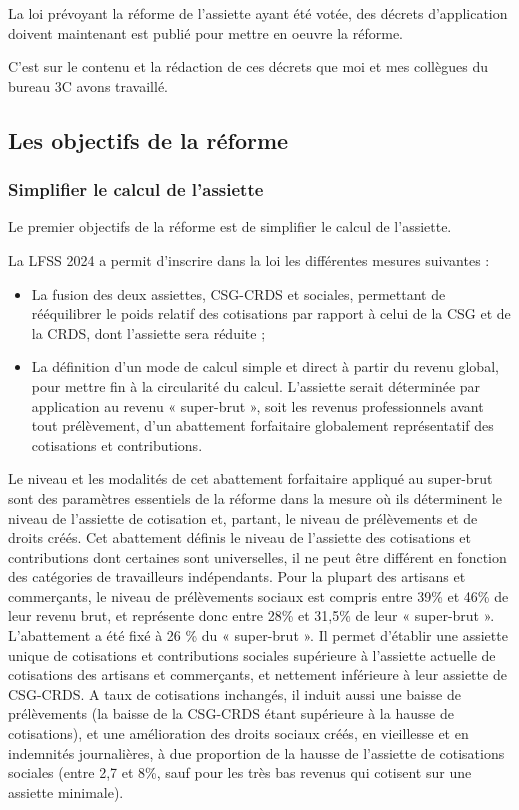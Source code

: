 La loi prévoyant la réforme de l'assiette ayant été votée, des décrets d'application doivent maintenant est publié pour mettre en oeuvre la réforme.

C'est sur le contenu et la rédaction de ces décrets que moi et mes collègues du bureau 3C avons travaillé.



\subsection{Les objectifs de la réforme}


\subsubsection{Simplifier le calcul de l'assiette}

Le premier objectifs de la réforme est de simplifier le calcul de l'assiette.

La LFSS 2024 a permit d'inscrire dans la loi les différentes mesures suivantes :
\begin{itemize}
    \item La fusion des deux assiettes, CSG-CRDS et sociales, permettant de rééquilibrer le poids relatif des cotisations par rapport à celui de la CSG et de la CRDS, dont l’assiette sera réduite ;
    \item La définition d'un mode de calcul simple et direct à partir du revenu global, pour mettre fin à la circularité du calcul. L’assiette serait déterminée par application au revenu « super-brut », soit les revenus professionnels avant tout prélèvement, d’un abattement forfaitaire globalement représentatif des cotisations et contributions. 
\end{itemize}

Le niveau et les modalités de cet abattement forfaitaire appliqué au super-brut sont des paramètres essentiels de la réforme dans la mesure où ils déterminent le niveau de l’assiette de cotisation et, partant, le niveau de prélèvements et de droits créés. Cet abattement définis le niveau de l’assiette des cotisations et contributions dont certaines sont universelles, il ne peut être différent en fonction des catégories de travailleurs indépendants. Pour la plupart des artisans et commerçants, le niveau de prélèvements sociaux est compris entre 39\% et 46\% de leur revenu brut, et représente donc entre 28\% et 31,5\% de leur « super-brut ». L'abattement a été fixé à 26 \% du « super-brut ». Il permet d’établir une assiette unique de cotisations et contributions sociales supérieure à l’assiette actuelle de cotisations des artisans et commerçants, et nettement inférieure à leur assiette de CSG-CRDS. A taux de cotisations inchangés, il induit aussi une baisse de prélèvements (la baisse de la CSG-CRDS étant supérieure à la hausse de cotisations), et une amélioration des droits sociaux créés, en vieillesse et en indemnités journalières, à due proportion de la hausse de l’assiette de cotisations sociales (entre 2,7 et 8\%, sauf pour les très bas revenus qui cotisent sur une assiette minimale). 

